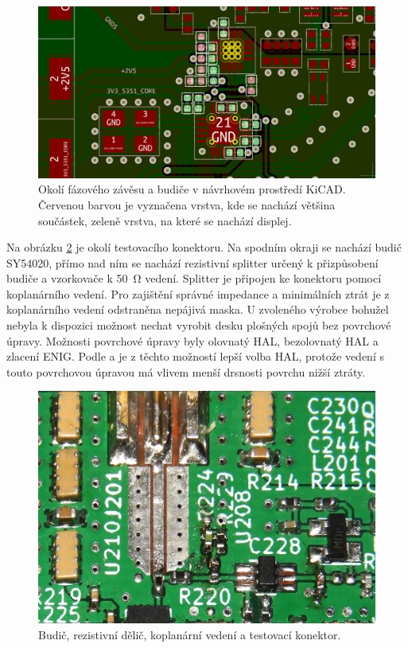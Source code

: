\begin{figure}[htbp]
\includegraphics[width=\textwidth,keepaspectratio]{images/pcb/pcb_decoupling.png}\caption{Okolí fázového závěsu a budiče v návrhovém prostředí KiCAD. Červenou barvou je vyznačena vrstva, kde se nachází většina součástek, zeleně vrstva, na které se nachází displej.}\label{pcb_decoupling}
\end{figure}

Na obrázku \ref{pcb_splitter} je okolí testovacího konektoru. Na spodním okraji se nachází budič SY54020, přímo nad ním se nachází rezistivní splitter určený k přizpůsobení budiče a vzorkovače k \SI{50}{\ohm} vedení. Splitter je připojen ke konektoru pomocí koplanárního vedení. Pro zajištění správné impedance a minimálních ztrát je z koplanárního vedení odstraněna nepájivá maska. U zvoleného výrobce bohužel nebyla k dispozici možnost nechat vyrobit desku plošných spojů bez povrchové úpravy. Možnosti povrchové úpravy byly olovnatý \acrshort{HAL}, bezolovnatý HAL a zlacení ENIG. Podle \cite{pcb_surface} a \cite{pcb_surface_simple} je z těchto možností lepší volba HAL, protože vedení s touto povrchovou úpravou má vlivem menší drsnosti povrchu nižší ztráty.
\begin{figure}[htbp]
\includegraphics[width=\textwidth,keepaspectratio]{images/pcb/pcb_splitter.jpg}\caption{Budič, rezistivní dělič, koplanární vedení a testovací konektor.}\label{pcb_splitter}
\end{figure}

